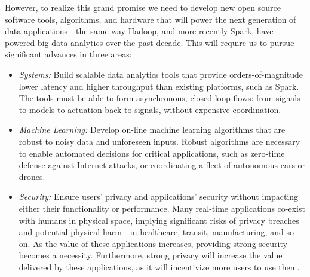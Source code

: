 \documentclass [10pt]{article}
\begin{document}
{However, to realize this grand promise we need to develop new open source software tools, algorithms, and hardware that will power the next generation of data applications---the same way Hadoop, and more recently Spark, have powered big data analytics over the past decade. This will require us to pursue significant advances in three areas:

\begin{itemize}[noitemsep,topsep=0pt,parsep=0pt,partopsep=0pt]
\item  {\em Systems:} Build scalable data analytics tools that provide orders-of-magnitude lower latency and higher throughput than existing platforms, such as Spark. The tools must be able to form asynchronous, closed-loop flows: from signals to models to actuation back to signals, without %
expensive coordination.

\item {\em Machine Learning:} Develop on-line machine learning algorithms that are robust to noisy data and unforeseen inputs. Robust algorithms are necessary to enable automated decisions for critical applications, such as zero-time defense against Internet attacks, or coordinating a fleet of autonomous cars or drones.

\item {\em Security:} Ensure users' privacy and applications' security without impacting either their functionality or performance. Many real-time applications co-exist with humans in physical space, implying significant risks of privacy breaches and potential physical harm---in healthcare, transit, manufacturing, and so on.  
As the value of these applications increases, providing strong security becomes a necessity. Furthermore, strong privacy will increase the value delivered by these applications, as it will incentivize more users to use them.
\end{itemize}


}
\end{document}
